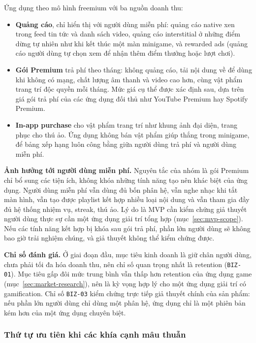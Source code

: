 Ứng dụng theo mô hình freemium với ba nguồn doanh thu:
\begin{itemize}
    \item \textbf{Quảng cáo}, chỉ hiển thị với người dùng miễn phí: quảng cáo native xen trong feed tin tức và danh sách video, quảng cáo interstitial ở những điểm dừng tự nhiên như khi kết thúc một màn minigame, và rewarded ads (quảng cáo người dùng tự chọn xem để nhận thêm điểm thưởng hoặc lượt chơi).
    \item \textbf{Gói Premium} trả phí theo tháng: không quảng cáo, tải nội dung về để dùng khi không có mạng, chất lượng âm thanh và video cao hơn, cùng vật phẩm trang trí độc quyền mỗi tháng.
    Mức giá cụ thể được xác định sau, dựa trên giá gói trả phí của các ứng dụng đối thủ như YouTube Premium hay Spotify Premium.
    \item \textbf{In-app purchase} cho vật phẩm trang trí như khung ảnh đại diện, trang phục cho thú ảo.
    Ứng dụng không bán vật phẩm giúp thắng trong minigame, để bảng xếp hạng luôn công bằng giữa người dùng trả phí và người dùng miễn phí.
\end{itemize}

\textbf{Ảnh hưởng tới người dùng miễn phí.}
Nguyên tắc của nhóm là gói Premium chỉ bổ sung các tiện ích, không khóa những tính năng tạo nên khác biệt của ứng dụng.
Người dùng miễn phí vẫn dùng đủ bốn phân hệ, vẫn nghe nhạc khi tắt màn hình, vẫn tạo được playlist kết hợp nhiều loại nội dung và vẫn tham gia đầy đủ hệ thống nhiệm vụ, streak, thú ảo.
Lý do là MVP cần kiểm chứng giả thuyết người dùng thực sự cần một ứng dụng giải trí tổng hợp (mục~\ref{sec:mvp-scope}).
Nếu các tính năng kết hợp bị khóa sau gói trả phí, phần lớn người dùng sẽ không bao giờ trải nghiệm chúng, và giả thuyết không thể kiểm chứng được.

\textbf{Chỉ số đánh giá.}
Ở giai đoạn đầu, mục tiêu kinh doanh là giữ chân người dùng, chưa phải tối đa hóa doanh thu, nên chỉ số quan trọng nhất là retention (\texttt{BIZ-01}).
Mục tiêu gấp đôi mức trung bình vẫn thấp hơn retention của ứng dụng game (mục~\ref{sec:market-research}), nên là kỳ vọng hợp lý cho một ứng dụng giải trí có gamification.
Chỉ số \texttt{BIZ-03} kiểm chứng trực tiếp giả thuyết chính của sản phẩm: nếu phần lớn người dùng chỉ dùng một phân hệ, ứng dụng chỉ là một phiên bản kém hơn của một ứng dụng chuyên biệt.

\subsubsection{Thứ tự ưu tiên khi các khía cạnh mâu thuẫn}

